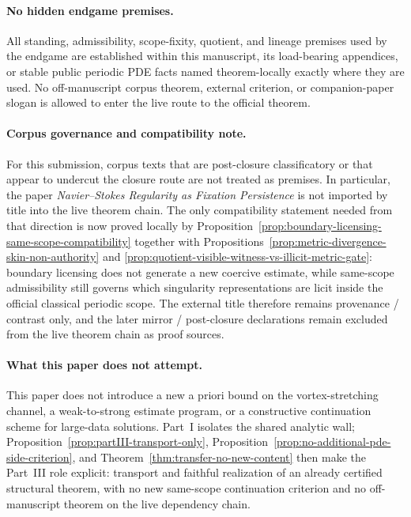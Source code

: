 \paragraph{No hidden endgame premises.}
All standing, admissibility, scope-fixity, quotient, and lineage premises used by the endgame are established within this manuscript, its load-bearing appendices, or stable public periodic PDE facts named theorem-locally exactly where they are used. No off-manuscript corpus theorem, external criterion, or companion-paper slogan is allowed to enter the live route to the official theorem.

\paragraph{Corpus governance and compatibility note.}
For this submission, corpus texts that are post-closure classificatory or that appear to undercut the closure route are not treated as premises. In particular, the paper \emph{Navier--Stokes Regularity as Fixation Persistence} is not imported by title into the live theorem chain. The only compatibility statement needed from that direction is now proved locally by Proposition~\ref{prop:boundary-licensing-same-scope-compatibility} together with Propositions~\ref{prop:metric-divergence-skin-non-authority} and \ref{prop:quotient-visible-witness-vs-illicit-metric-gate}: boundary licensing does not generate a new coercive estimate, while same-scope admissibility still governs which singularity representations are licit inside the official classical periodic scope. The external title therefore remains provenance / contrast only, and the later mirror / post-closure declarations remain excluded from the live theorem chain as proof sources.

\paragraph{What this paper does not attempt.}
This paper does not introduce a new a priori bound on the vortex-stretching channel, a weak-to-strong estimate program, or a constructive continuation scheme for large-data solutions. Part~I isolates the shared analytic wall; Proposition~\ref{prop:partIII-transport-only}, Proposition~\ref{prop:no-additional-pde-side-criterion}, and Theorem~\ref{thm:transfer-no-new-content} then make the Part~III role explicit: transport and faithful realization of an already certified structural theorem, with no new same-scope continuation criterion and no off-manuscript theorem on the live dependency chain.

